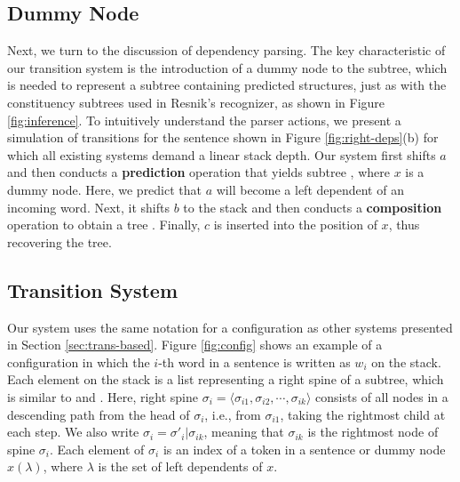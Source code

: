 \documentclass[english]{jnlp_1.4}
\begin{document}
\subsection{Dummy Node}

Next, we turn to the discussion of dependency parsing.
The key characteristic of our transition system is the introduction of a dummy node to the subtree, which is needed to represent a subtree containing predicted structures, just as with the constituency subtrees used in Resnik's recognizer, as shown in Figure \ref{fig:inference}.
To intuitively understand the parser actions, 
    we present a simulation of transitions for the sentence shown in Figure \ref{fig:right-deps}(b) for which 
all existing systems demand a linear stack depth.
Our system first shifts $a$ and then conducts a {\bf prediction} operation that yields subtree \hspace{-3pt}, where $x$ is a dummy node.
Here, we predict that $a$ will become a left dependent of an incoming word.
Next, it shifts $b$ to the stack and then conducts a {\bf composition} operation to obtain a tree \hspace{-3pt}.
Finally, $c$ is inserted into the position of $x$, thus recovering the tree.


\subsection{Transition System}
\label{subsec:transitionsystem}

Our system uses the same notation for a configuration as other systems presented in Section \ref{sec:trans-based}.
Figure \ref{fig:config} shows an example of a configuration in which the $i$-th word in a sentence is written as $w_i$ on the stack.
Each element on the stack is a list representing a right spine of a subtree, which is similar to  and .
Here, right spine $\sigma_i = \langle \sigma_{i1},\sigma_{i2},\cdots,\sigma_{ik} \rangle$ consists of all nodes in a descending path from the head of $\sigma_i$, i.e., from $\sigma_{i1}$, taking the rightmost child at each step.
We also write $\sigma_i = \sigma'_i | \sigma_{ik}$, meaning that $\sigma_{ik}$ is the rightmost node of spine $\sigma_i$.
Each element of $\sigma_i$ is an index of a token in a sentence or dummy node $x(\lambda)$, where $\lambda$ is the set of left dependents of $x$.
\end{document}
